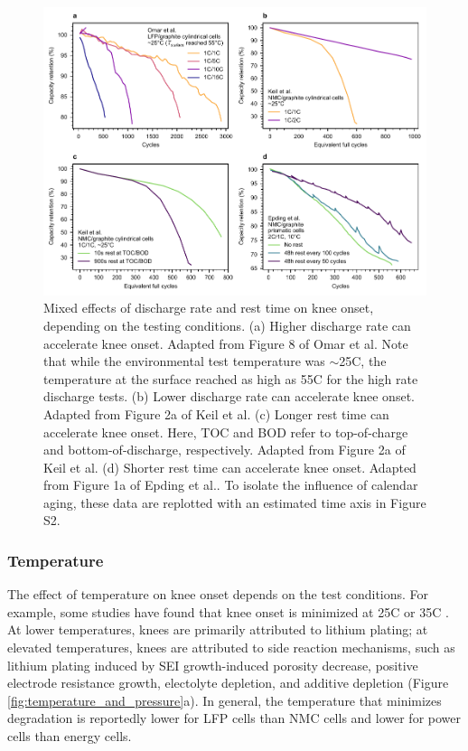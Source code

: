 \documentclass[journal=jpclcd,manuscript=article]{achemso}
\begin{document}
\begin{figure}[ht!]
\centering
\includegraphics[scale = 1.0]{final_figures/discharge_rate_rest_cycles.pdf}
\caption{Mixed effects of discharge rate and rest time on knee onset, depending on the testing conditions. (a) Higher discharge rate can accelerate knee onset. Adapted from Figure 8 of Omar et al.\cite{omar_lithium_2014}
Note that while the environmental test temperature was $\sim$25\degree C, the temperature at the surface reached as high as 55\degree C for the high rate discharge tests.
(b) Lower discharge rate can accelerate knee onset. Adapted from Figure 2a of Keil et al.\cite{keil_linear_2019} (c) Longer rest time can accelerate knee onset. Here, TOC and BOD refer to top-of-charge and bottom-of-discharge, respectively. Adapted from  Figure 2a of Keil et al.\cite{keil_linear_2019} (d) Shorter rest time can accelerate knee onset. Adapted from Figure 1a of Epding et al.\cite{epding_investigation_2019}. To isolate the influence of calendar aging, these data are replotted with an estimated time axis in Figure S2.}
\label{fig:discharge-rest_cycle}
\end{figure}


\subsubsection{Temperature}
The effect of temperature on knee onset depends on the test conditions. For example, some studies have found that knee onset is minimized at 25\degree C \cite{zhang_accelerated_2019, waldmann_temperature_2014, waldmann_optimization_2015} or 35\degree C \cite{schuster_nonlinear_2015}{}. At lower temperatures, knees are primarily attributed to lithium plating; at elevated temperatures, knees are attributed to side reaction mechanisms, such as lithium plating induced by SEI growth-induced porosity decrease, positive electrode resistance growth, electolyte depletion, and additive depletion (Figure \ref{fig:temperature_and_pressure}a).\cite{broussely_main_2005, zhang_accelerated_2019,schuster_nonlinear_2015,waldmann_temperature_2014,waldmann_optimization_2015,stevens_using_2014} In general, the temperature that minimizes degradation is reportedly lower for LFP cells than NMC cells \cite{preger_degradation_2020} and lower for power cells than energy cells\cite{yang_understanding_2018}.
\end{document}
